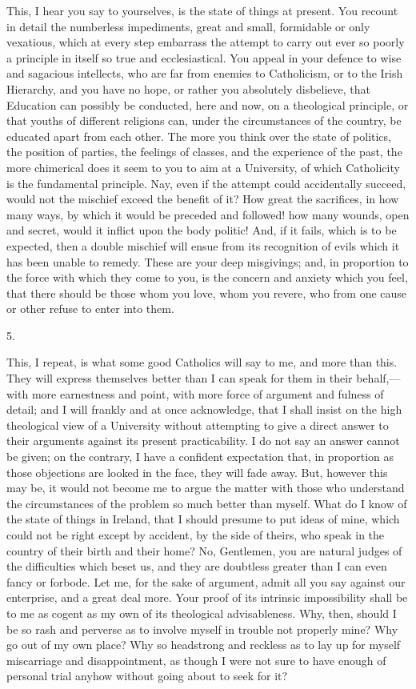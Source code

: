 This, I hear you say to yourselves, is the state of things at
present. You recount in detail the numberless impediments, great and
small, formidable or only vexatious, which at every step embarrass the
attempt to carry out ever so poorly a principle in itself so true and
ecclesiastical. You appeal in your defence to wise and sagacious
intellects, who are far from enemies to Catholicism, or to the Irish
Hierarchy, and you have no hope, or rather you absolutely disbelieve,
that Education can possibly be conducted, here and now, on a
theological principle, or that youths of different religions can,
under the circumstances of the country, be educated apart from each
other. The more you think over the state of politics, the position of
parties, the feelings of classes, and the experience of the past, the
more chimerical does it seem to you to aim at a University, of which
Catholicity is the fundamental principle. Nay, even if the attempt
could accidentally succeed, would not the mischief exceed the benefit
of it? How great the sacrifices, in how many ways, by which it would
be preceded and followed! how many wounds, open and secret, would it
inflict upon the body politic! And, if it fails, which is to be
expected, then a double mischief will ensue from its recognition of
evils which it has been unable to remedy. These are your deep
misgivings; and, in proportion to the force with which they come
to you, is the concern and anxiety which you feel, that there should
be those whom you love, whom you revere, who from one cause or other
refuse to enter into them.

5.

This, I repeat, is what some good Catholics will say to me, and
more than this. They will express themselves better than I can speak
for them in their behalf,—with more earnestness and point, with more
force of argument and fulness of detail; and I will frankly and at
once acknowledge, that I shall insist on the high theological view of
a University without attempting to give a direct answer to their
arguments against its present practicability. I do not say an answer
cannot be given; on the contrary, I have a confident expectation that,
in proportion as those objections are looked in the face, they will
fade away. But, however this may be, it would not become me to argue
the matter with those who understand the circumstances of the problem
so much better than myself. What do I know of the state of things in
Ireland, that I should presume to put ideas of mine, which could not
be right except by accident, by the side of theirs, who speak in the
country of their birth and their home? No, Gentlemen, you are natural
judges of the difficulties which beset us, and they are doubtless
greater than I can even fancy or forbode. Let me, for the sake of
argument, admit all you say against our enterprise, and a great deal
more. Your proof of its intrinsic impossibility shall be to me as
cogent as my own of its theological advisableness. Why, then, should I
be so rash and perverse as to involve myself in trouble not properly
mine? Why go out of my own place? Why so headstrong and reckless
as to lay up for myself miscarriage and disappointment, as though I
were not sure to have enough of personal trial anyhow without going
about to seek for it?

